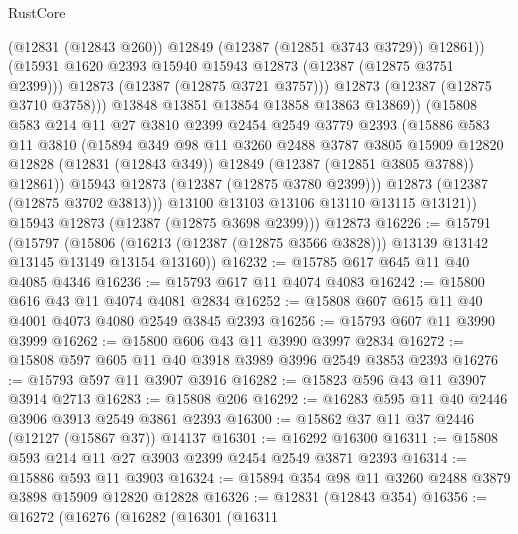 \begin{lexlean}{RustCore}
\begin{coremodule}
                        (@12831 (@12843 @260))
                        @12849
                        (@12387 (@12851 @3743 @3729))
                        @12861))
                    (@15931 @1620 @2393 @15940 @15943 @12873 (@12387 (@12875 @3751 @2399)))
                    @12873
                    (@12387 (@12875 @3721 @3757)))
                  @12873
                  (@12387 (@12875 @3710 @3758)))
                @13848
                @13851
                @13854
                @13858
                @13863
                @13869))
            (@15808
              @583
              @214
              @11
              @27
              @3810
              @2399
              @2454
              @2549
              @3779
              @2393
              (@15886
                @583
                @11
                @3810
                (@15894
                  @349
                  @98
                  @11
                  @3260
                  @2488
                  @3787
                  @3805
                  @15909
                  @12820
                  @12828
                  (@12831 (@12843 @349))
                  @12849
                  (@12387 (@12851 @3805 @3788))
                  @12861))
              @15943
              @12873
              (@12387 (@12875 @3780 @2399)))
            @12873
            (@12387 (@12875 @3702 @3813)))
          @13100
          @13103
          @13106
          @13110
          @13115
          @13121))
      @15943
      @12873
      (@12387 (@12875 @3698 @2399)))
    @12873
@16226 := @15791
    (@15797
      (@15806 (@16213 (@12387 (@12875 @3566 @3828))) @13139 @13142 @13145 @13149 @13154 @13160))
@16232 := @15785 @617 @645 @11 @40 @4085 @4346
@16236 := @15793 @617 @11 @4074 @4083
@16242 := @15800 @616 @43 @11 @4074 @4081 @2834
@16252 := @15808 @607 @615 @11 @40 @4001 @4073 @4080 @2549 @3845 @2393
@16256 := @15793 @607 @11 @3990 @3999
@16262 := @15800 @606 @43 @11 @3990 @3997 @2834
@16272 := @15808 @597 @605 @11 @40 @3918 @3989 @3996 @2549 @3853 @2393
@16276 := @15793 @597 @11 @3907 @3916
@16282 := @15823 @596 @43 @11 @3907 @3914 @2713
@16283 := @15808 @206
@16292 := @16283 @595 @11 @40 @2446 @3906 @3913 @2549 @3861 @2393
@16300 := @15862 @37 @11 @37 @2446 (@12127 (@15867 @37)) @14137
@16301 := @16292 @16300
@16311 := @15808 @593 @214 @11 @27 @3903 @2399 @2454 @2549 @3871 @2393
@16314 := @15886 @593 @11 @3903
@16324 := @15894 @354 @98 @11 @3260 @2488 @3879 @3898 @15909 @12820 @12828
@16326 := @12831 (@12843 @354)
@16356 := @16272
    (@16276
      (@16282
        (@16301
          (@16311

\end{coremodule}
\end{lexlean}
